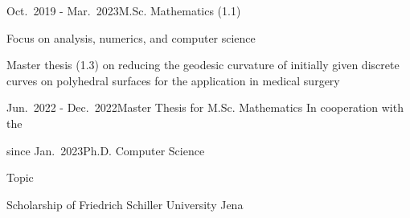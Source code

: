 \documentclass[a4paper,10pt]{cv}
\begin{document}
      \begin{cvTimeItem}{Oct.~2019 - Mar.~2023}{M.Sc. Mathematics (1.1)}
        \begin{cvItemize}
          \item Focus on analysis, numerics, and computer science
          \item Master thesis  (1.3) on reducing the geodesic curvature of initially given discrete curves on polyhedral surfaces for the application in medical surgery
        \end{cvItemize}
      \end{cvTimeItem}

      \begin{cvTimeItem}{Jun.~2022 - Dec.~2022}{Master Thesis for M.Sc. Mathematics}
          In cooperation with the 
      \end{cvTimeItem}

      \begin{cvTimeItem}{since Jan.~2023}{Ph.D. Computer Science}
        \begin{cvItemize}
          \item Topic 
          \item Scholarship  of Friedrich Schiller University Jena
        \end{cvItemize}
      \end{cvTimeItem}
\end{document}
